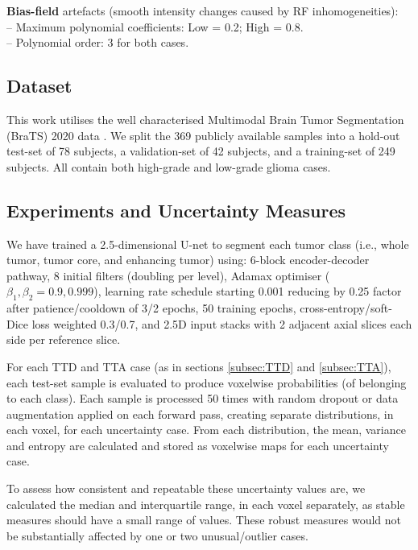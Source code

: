 \documentclass[runningheads]{llncs}
\begin{document}
\noindent
\textbf{Bias-field} artefacts (smooth intensity changes caused by RF inhomogeneities):\\
\hspace*{0.5cm} -- Maximum polynomial coefficients: Low = 0.2; High = 0.8.\\
\hspace*{0.5cm} -- Polynomial order: 3 for both cases.

\subsection{Dataset}
This work utilises the well characterised Multimodal Brain Tumor Segmentation (BraTS) 2020 data \cite{ref_brats1,ref_brats2,ref_brats3}. We split the 369 publicly available samples into a hold-out test-set of 78 subjects, a validation-set of 42 subjects, and a training-set of 249 subjects. All contain both high-grade and low-grade glioma cases.

\subsection{Experiments and Uncertainty Measures}

We have trained a 2.5-dimensional U-net to segment each tumor class (i.e., whole tumor, tumor core, and enhancing tumor) using: 6-block encoder-decoder pathway, 8 initial filters (doubling per level), Adamax optimiser ($\beta_1,\beta_2 = 0.9,0.999$), learning rate schedule starting 0.001 reducing by 0.25 factor after patience/cooldown of 3/2 epochs, 50 training epochs, cross-entropy/soft-Dice loss weighted 0.3/0.7, and 2.5D input stacks with 2 adjacent axial slices each side per reference slice.

For each TTD and TTA case (as in sections \ref{subsec:TTD} and \ref{subsec:TTA}), each test-set sample is evaluated to produce voxelwise probabilities (of belonging to each class). Each sample is processed 50 times with random dropout or data augmentation applied on each forward pass, creating separate distributions, in each voxel, for each uncertainty case. From each distribution, the mean, variance and entropy are calculated and stored as voxelwise maps for each uncertainty case.

To assess how consistent and repeatable these uncertainty values are, we calculated the median and interquartile range, in each voxel separately, as stable measures should have a small range of values. These robust measures would not be substantially affected by one or two unusual/outlier cases.
\end{document}
